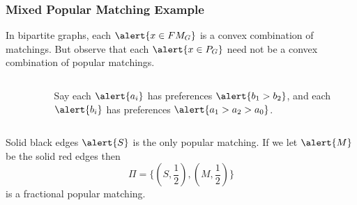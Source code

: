 \documentclass[10pt]{beamer}
\begin{document}
\begin{frame}
\frametitle{Mixed Popular Matching Example}
In bipartite graphs, each $\alert{x \in FM_G}$ is a convex combination of matchings. But observe that each $\alert{x\in P_G}$ need not be a convex combination of popular matchings.
\begin{columns}[T] %
\begin{column}{.48\textwidth}
\begin{figure}
\end{figure}
\end{column}%
\hfill%
\begin{column}{.48\textwidth}
$$ $$
Say each $\alert{a_i}$ has preferences $\alert{b_1 > b_2}$, and each $\alert{b_i}$ has preferences $\alert{a_1 > a_2 > a_0}$.
\end{column}%
\end{columns}
Solid black edges $\alert{S}$ is the only popular matching. If we let $\alert{M}$ be the solid red edges then $$\Pi= \{(S,\frac{1}{2}), (M,\frac{1}{2})\}$$ is a fractional popular matching.
\end{frame}
\end{document}
